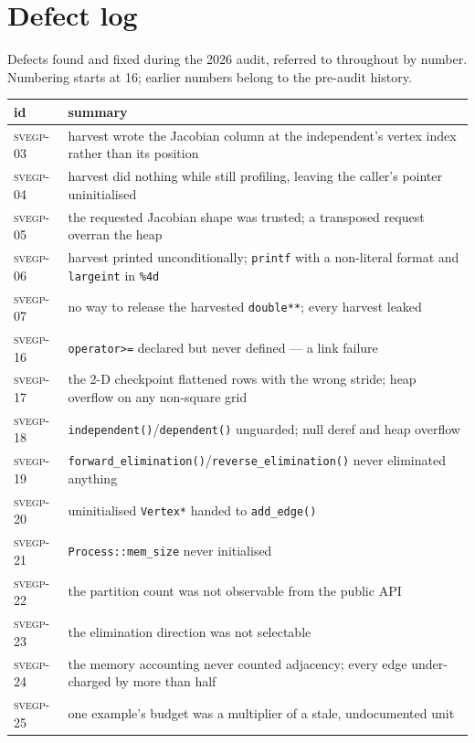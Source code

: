 \documentclass[11pt,a4paper]{report}
\newcommand{\svegp}[1]{\textsc{svegp-#1}}
\newcommand{\code}[1]{\texttt{#1}}
\begin{document}
\appendix

\chapter{Defect log}

Defects found and fixed during the 2026 audit, referred to throughout by
number. Numbering starts at 16; earlier numbers belong to the pre-audit history.

\begin{center}
\begin{longtable}{@{}lp{12.4cm}@{}}
\toprule
id & summary \\
\midrule
\endhead
\svegp{03} & harvest wrote the Jacobian column at the independent's vertex index rather than its position \\
\svegp{04} & harvest did nothing while still profiling, leaving the caller's pointer uninitialised \\
\svegp{05} & the requested Jacobian shape was trusted; a transposed request overran the heap \\
\svegp{06} & harvest printed unconditionally; \code{printf} with a non-literal format and \code{largeint} in \code{\%4d} \\
\svegp{07} & no way to release the harvested \code{double**}; every harvest leaked \\
\svegp{16} & \code{operator>=} declared but never defined --- a link failure \\
\svegp{17} & the 2-D checkpoint flattened rows with the wrong stride; heap overflow on any non-square grid \\
\svegp{18} & \code{independent()}/\code{dependent()} unguarded; null deref and heap overflow \\
\svegp{19} & \code{forward\_elimination()}/\code{reverse\_elimination()} never eliminated anything \\
\svegp{20} & uninitialised \code{Vertex*} handed to \code{add\_edge()} \\
\svegp{21} & \code{Process::mem\_size} never initialised \\
\svegp{22} & the partition count was not observable from the public API \\
\svegp{23} & the elimination direction was not selectable \\
\svegp{24} & the memory accounting never counted adjacency; every edge under-charged by more than half \\
\svegp{25} & one example's budget was a multiplier of a stale, undocumented unit \\

\end{longtable}
\end{center}
\end{document}
